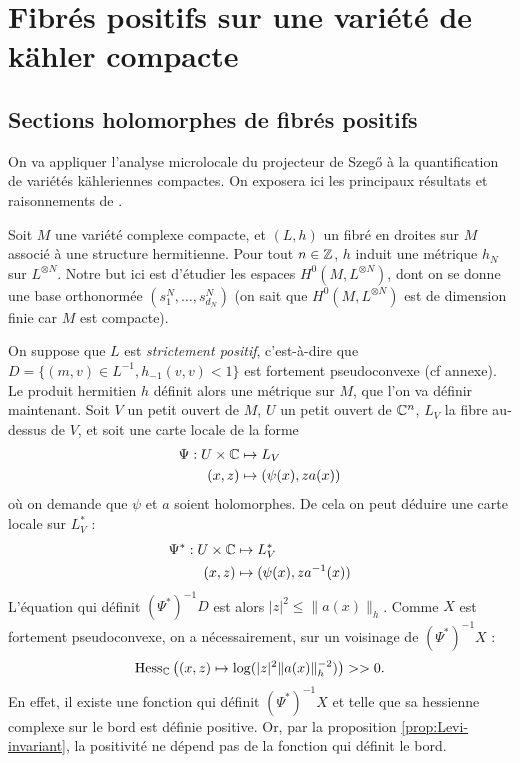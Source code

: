 \section{Fibrés positifs sur une variété de kähler compacte}

\subsection{Sections holomorphes de fibrés positifs}

On va appliquer l'analyse microlocale du projecteur de Szeg\H{o} à la quantification de variétés kähleriennes compactes. On exposera ici les principaux résultats et raisonnements de \cite{Zelditch2000}.

Soit $M$ une variété complexe compacte, et $(L,h)$ un fibré en droites sur $M$ associé à une structure hermitienne. Pour tout $n \in \mathbb{Z}$, $h$ induit une métrique $h_N$ sur $L^{\otimes N}$. Notre but ici est d'étudier les espaces $H^0(M,L^{\otimes N})$, dont on se donne une base orthonormée $(s^N_1, \ldots, s^N_{d_N})$ (on sait que $H^0(M,L^{\otimes N})$ est de dimension finie car $M$ est compacte).

On suppose que $L$ est \emph{strictement positif}, c'est-à-dire que $D=\{(m,v) \in L^{-1}, h_{-1}(v,v) < 1\}$ est fortement pseudoconvexe (cf annexe). Le produit hermitien $h$ définit alors une métrique sur $M$, que l'on va définir maintenant. Soit $V$ un petit ouvert de $M$, $U$ un petit ouvert de $\mathbb{C}^n$, $L_V$ la fibre au-dessus de $V$, et soit une carte locale de la forme
\begin{align*}
	\Psi : U \times \mathbb{C} &\mapsto L_V\\
	(x,z) &\mapsto (\psi(x),za(x))
\end{align*}
où on demande que $\psi$ et $a$ soient holomorphes. De cela on peut déduire une carte locale sur $L^*_V$ :
\begin{align*}
	\Psi^* : U \times \mathbb{C} &\mapsto L^*_V\\
	(x,z) &\mapsto (\psi(x),za^{-1}(x))
\end{align*}
L'équation qui définit $(\Psi^*)^{-1}D$ est alors $|z|^2\leq\|a(x)\|_h$. Comme $X$ est fortement pseudoconvexe, on a nécessairement, sur un voisinage de $(\Psi^*)^{-1}X$ : 
\begin{equation*}
	\operatorname{Hess}_{\mathbb{C}} \left((x,z) \mapsto \log(|z|^2\|a(x)\|_h^{-2}) \right) >>0.
\end{equation*} En effet, il existe une fonction qui définit $(\Psi^*)^{-1}X$ et telle que sa hessienne complexe sur le bord est définie positive. Or, par la proposition \ref{prop:Levi-invariant}, la positivité ne dépend pas de la fonction qui définit le bord.

